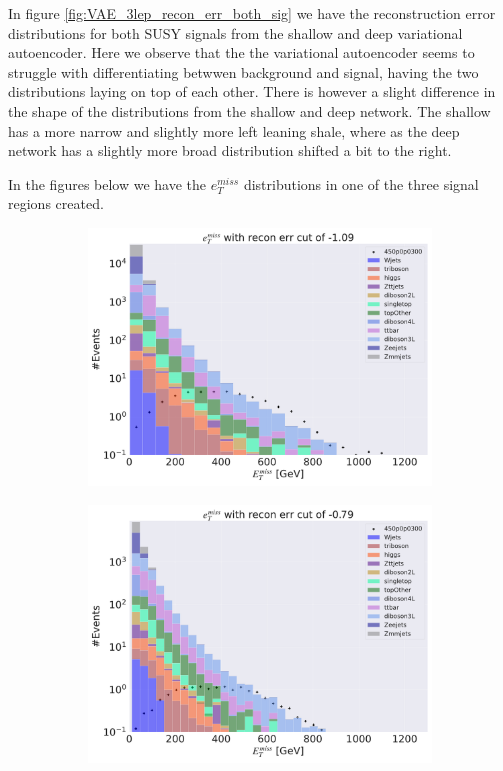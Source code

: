 In figure \ref{fig:VAE_3lep_recon_err_both_sig} we have the reconstruction error distributions for both SUSY signals from 
the shallow and deep variational autoencoder. Here we observe that the the variational autoencoder seems to struggle with 
differentiating betwwen background and signal, having the two distributions laying on top of each other. There is however a 
slight difference in the shape of the distributions from the shallow and deep network. The shallow has a more narrow 
and slightly more left leaning shale, where as the deep network has a slightly more broad distribution shifted a bit to the right. \par 
In the figures below we have the $e_T^{miss}$ distributions in one of the three signal regions created.

\begin{figure}[H]
    \centering
    \begin{subfigure}{.45\textwidth}
        \includegraphics[width=\textwidth]{Figures/VAE_testing/big/3lep/b_data_recon_big_rm3_feats_sig_450p0p0300_etmiss_recon_errcut_-0.79.pdf}
        \caption{ }
        \label{fig:VAE_3lep_big_450_cut_etmiss}
    \end{subfigure}
    \hfill
    \begin{subfigure}{.45\textwidth}
        \includegraphics[width=\textwidth]{Figures/VAE_testing/small/3lep/b_data_recon_big_rm3_feats_sig_450p0p0300_etmiss_recon_errcut_-0.79.pdf}

\end{subfigure}
\end{figure}
